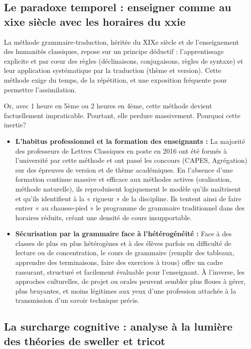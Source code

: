 \subsection{Le paradoxe temporel : enseigner comme au xixe siècle avec les horaires du xxie}

La méthode grammaire-traduction, héritée du XIXe siècle et de l'enseignement des humanités
classiques, repose sur un principe déductif : l'apprentissage explicite et par cœur des règles
(déclinaisons, conjugaisons, règles de syntaxe) et leur application systématique par la traduction
(thème et version).\cite{I-3-2-ref23} Cette méthode exige du temps, de la répétition, et une
exposition fréquente pour permettre l'assimilation.

Or, avec 1 heure en 5ème ou 2 heures en 4ème, cette méthode devient factuellement impraticable.
Pourtant, elle perdure massivement. Pourquoi cette inertie?

\begin{itemize}\item \textbf{L'habitus professionnel et la formation des enseignants :} La majorité des professeurs de Lettres Classiques en poste en 2016 ont été formés à l'université par cette méthode et ont passé les concours (CAPES, Agrégation) sur des épreuves de version et de thème académiques.\cite{I-3-2-ref24} En l'absence d'une formation continue massive et efficace aux méthodes actives (oralisation, méthode naturelle), ils reproduisent logiquement le modèle qu'ils maîtrisent et qu'ils identifient à la « rigueur » de la discipline. Ils tentent ainsi de faire entrer « au chausse-pied » le programme de grammaire traditionnel dans des horaires réduits, créant une densité de cours insupportable.\item \textbf{Sécurisation par la grammaire face à l'hétérogénéité :} Face à des classes de plus en plus hétérogènes et à des élèves parfois en difficulté de lecture ou de concentration, le cours de grammaire (remplir des tableaux, apprendre des terminaisons, faire des exercices à trous) offre un cadre rassurant, structuré et facilement évaluable pour l'enseignant. À l'inverse, les approches culturelles, de projet ou orales peuvent sembler plus floues à gérer, plus bruyantes, et moins légitimes aux yeux d'une profession attachée à la transmission d'un savoir technique précis.\cite{I-3-2-ref18}\end{itemize}

\subsection{La surcharge cognitive : analyse à la lumière des théories de sweller et tricot}

